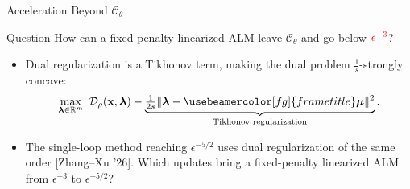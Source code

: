 \documentclass[10pt]{beamer}
\newcommand{\red}[1]{{\color[rgb]{1,0,0}{#1}}}
\newcommand{\blue}[1]{{\usebeamercolor[fg]{frametitle}#1}}
\newcommand{\citeb}[1]{{\color{gray!75!black}\footnotesize[#1]}}
\newcommand{\RR}{\mathbb{R}}
\newcommand{\bx}{\mathbf{x}}
\newcommand{\bmu}{\bm{\mu}}
\newcommand{\blmbd}{\bm{\lambda}}
\newcommand{\calD}{\mathcal{D}}
\newcommand{\calC}{\mathcal{C}}
\begin{document}
\begin{frame}{Acceleration Beyond $\calC_\theta$}
\small
\begin{block}{Question}
\centering
How can a fixed-penalty linearized ALM leave $\calC_\theta$ and go below $\red{\epsilon^{-3}}$?
\end{block}

\vspace{0.15cm}
\begin{itemize}\setlength{\itemsep}{6pt}
    \item Dual regularization is a Tikhonov term, making the dual problem $\tfrac{1}{s}$-strongly concave:
    \[
        \max_{\blmbd\in\RR^m}\ \calD_\rho(\bx,\blmbd)-\underbrace{\tfrac{1}{2s}\|\blmbd-\blue{\bmu}\|^2}_{\text{Tikhonov regularization}} .
    \]
    \item The single-loop method reaching $\epsilon^{-5/2}$ uses dual regularization of the same order \citeb{Zhang--Xu '26}. Which updates bring a fixed-penalty linearized ALM from $\epsilon^{-3}$ to $\epsilon^{-5/2}$?
\end{itemize}
\end{frame}



\end{document}
